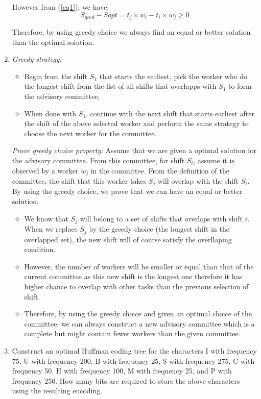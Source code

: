 \documentclass[11pts]{report}
\begin{document}
\begin{enumerate}
However from (\ref{eq1}), we have:
\begin{equation*}
S_{gred} - S{opt} = t_j \times w_i - t_i \times w_j \geq 0
\end{equation*}

Therefore, by using greedy choice we always find an equal or better solution than the optimal solution.

\item \textit{Greedy strategy:}

\begin{itemize}
\item Begin from the shift $S_1$ that starts the earliest, pick the worker who do the longest shift from the list of all shifts that overlapps with $S_1$ to form the advisory committee.
\item When done with $S_1$, continue with the next shift that starts earliest after the shift of the above selected worker and perform the same strategy to choose the next worker for the committee.
\end{itemize}

\textit{Prove greedy choice property:}
Assume that we are given a optimal solution for the advisory committee. From this committee, for shift $S_i$, assume it is observed by a worker $w_j$ in the committee. From the definition of the committee, the shift that this worker takes  $S_j$ will overlap with the shift $S_i$. By using the greedy choice, we prove that we can have an equal or better solution.
\begin{itemize}
\item We know that $S_j$ will belong to a set of shifts that overlaps with shift $i$. When we replace $S_j$ by the greedy choice (the longest shift in the overlapped set), the new shift will of course satisfy the overllaping condition. 
\item However, the number of workers will be smaller or equal than that of the current committee as this new shift is the longest one therefore it has higher chance to overlap with other tasks than the previous selection of shift.
\item Therefore, by using the greedy choice and given an optimal choice of the committee, we can always construct a new advisory committee which is a complete but might contain fewer workers than the given committee.
\end{itemize}  

\item Construct an optimal Huffman coding tree for the characters I with frequency 75, U with frequency 200, B with frequency 25, S with frequency 275, C with frequency 50, H with
frequency 100, M with frequency 25, and P with frequency 250. How many bits are required to store the above characters using the resulting encoding.


\end{enumerate}
\end{document}
